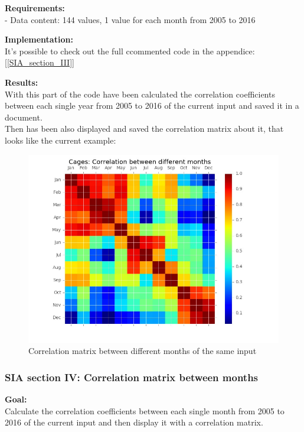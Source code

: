 \textbf{Requirements:}\\
- Data content: 144 values, 1 value for each month from 2005 to 2016

\textbf{Implementation:}\\
It's possible to check out the full ccommented code in the appendice: [\ref{SIA_section_III}]

\textbf{Results:} \\
With this part of the code have been calculated the correlation coefficients between each single year from 2005 to 2016 of the current input and saved it in a document. \\
Then has been also displayed and saved the correlation matrix about it, that looks like the current example:

\begin{figure}[H]
	\centering
    \includegraphics[width=1\textwidth]{Files/Cages_Months_Matrix.jpg}
    \caption{Correlation matrix between different months of the same input}
\end{figure}




\newpage
\subsubsection{SIA section IV: Correlation matrix between months}

\textbf{Goal:}\\
Calculate the correlation coefficients between each single month from 2005 to 2016 of the current input and then display it with a correlation matrix.

